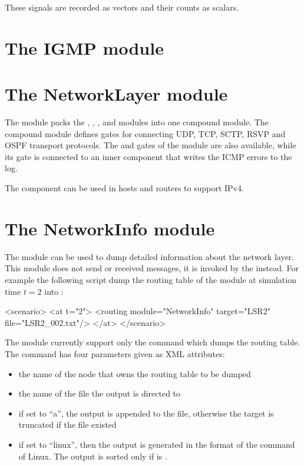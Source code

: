 These signals are recorded as vectors and their counts as scalars.


\section{The IGMP module}


\section{The NetworkLayer module}

The  module packs the , ,
, and  modules into one compound module.
The compound module defines gates for connecting UDP, TCP, SCTP, RSVP and
OSPF transport protocols. The  and  gates of the
 module are also available, while its  gate
is connected to an inner  component that writes
the ICMP errors to the log.

The component can be used in hosts and routers to support IPv4.

\section{The NetworkInfo module}

The  module can be used to dump detailed information
about the network layer. This module does not send or received messages,
it is invoked by the  instead. For example
the following  script dump the routing table
of the  module at simulation time $t=2$ into :
\begin{filelisting}
<scenario>
  <at t="2">
    <routing module="NetworkInfo" target="LSR2" file="LSR2_002.txt"/>
  </at>
</scenario>
\end{filelisting}

The module currently support only the  command which dumps
the routing table. The command has four parameters given as XML attributes:
\begin{itemize}
  \item {} the name of the node that owns the routing table to be dumped
  \item {} the name of the file the output is directed to
  \item {} if set to ``a'', the output is appended to the file,
                   otherwise the target is truncated if the file existed
  \item {} if set to ``linux'', then the output is generated
                     in the format of the  command of Linux.
                     The output is sorted only if  is
                     .
\end{itemize}

